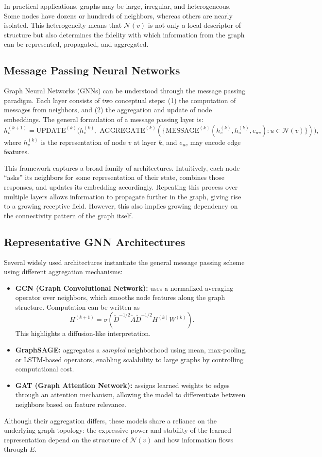 \documentclass[letterpaper,12pt]{article}
\begin{document}
In practical applications, graphs may be large, irregular, and heterogeneous. Some nodes have dozens or hundreds of neighbors, whereas others are nearly isolated. This heterogeneity means that \(\mathcal{N}(v)\) is not only a local descriptor of structure but also determines the fidelity with which information from the graph can be represented, propagated, and aggregated.

\subsection{Message Passing Neural Networks}

Graph Neural Networks (GNNs) can be understood through the message passing paradigm. Each layer consists of two conceptual steps:
(1) the computation of messages from neighbors, and
(2) the aggregation and update of node embeddings.
The general formulation of a message passing layer is:
\[
h_v^{(k+1)} = \mathrm{UPDATE}^{(k)}
\Big(
h_v^{(k)},\;
\mathrm{AGGREGATE}^{(k)}
(\{\mathrm{MESSAGE}^{(k)}(h_v^{(k)}, h_u^{(k)}, e_{uv}) : u \in \mathcal{N}(v)\})
\Big),
\]
where \(h_v^{(k)}\) is the representation of node \(v\) at layer \(k\), and \(e_{uv}\) may encode edge features.

This framework captures a broad family of architectures. Intuitively, each node ``asks'' its neighbors for some representation of their state, combines those responses, and updates its embedding accordingly. Repeating this process over multiple layers allows information to propagate further in the graph, giving rise to a growing receptive field. However, this also implies growing dependency on the connectivity pattern of the graph itself.

\subsection{Representative GNN Architectures}

Several widely used architectures instantiate the general message passing scheme using different aggregation mechanisms:
\begin{itemize}
    \item \textbf{GCN (Graph Convolutional Network):} uses a normalized averaging operator over neighbors, which smooths node features along the graph structure. Computation can be written as
    \[
    H^{(k+1)} = \sigma(\tilde{D}^{-1/2}\tilde{A}\tilde{D}^{-1/2} H^{(k)} W^{(k)}).
    \]
    This highlights a diffusion-like interpretation.
    \item \textbf{GraphSAGE:} aggregates a \textit{sampled} neighborhood using mean, max-pooling, or LSTM-based operators, enabling scalability to large graphs by controlling computational cost.
    \item \textbf{GAT (Graph Attention Network):} assigns learned weights to edges through an attention mechanism, allowing the model to differentiate between neighbors based on feature relevance.
\end{itemize}
Although their aggregation differs, these models share a reliance on the underlying graph topology: the expressive power and stability of the learned representation depend on the structure of \(\mathcal{N}(v)\) and how information flows through \(E\).
\end{document}
